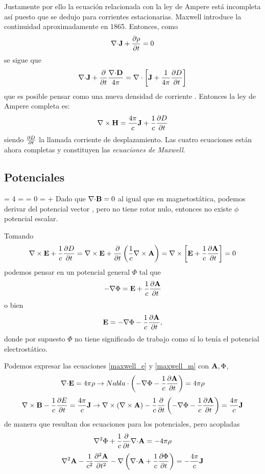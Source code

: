 \documentclass[10pt,oneside]{CBFT_book}
\begin{document}
Justamente por ello la ecuación relacionada con la ley de Ampere está incompleta así puesto que se dedujo
para corrientes estacionarias. Maxwell introduce la continuidad aproximadamente en 1865.
Entonces, como 
\[
	\mathbf{\nabla}\mathbf{\cdot}\mathbf{J} + \frac{\partial^{\hspace{-0.05em}} {\rho}}{\partial {t }^{\hspace{-0.05em}}} = 0 
\]
se sigue que 
\[
	\divem{J} + \frac{\partial}{\partial t} \frac{\divem{D}}{4\pi} =
	\Nabla\cdot\left[ \vb{J} + \frac{1}{4\pi} \dpar{D}{t} \right]
\]
que es posible pensar como una nueva densidad de corriente . 
Entonces la ley de Ampere completa es:
\[
	\rotorm{H} = \frac{4\pi}{c} \vb{J} + \frac{1}{c}\dpar{D}{t}
\]
siendo $\frac{\partial^{\hspace{-0.05em}} {D}}{\partial {t}^{\hspace{-0.05em}}}$ la llamada corriente de desplazamiento. 
Las cuatro ecuaciones están ahora completas y constituyen las {\it ecuaciones de Maxwell}.

\subsection{Potenciales}

\be
	 = 4 \pi \rho \qquad \qquad {} =  
	\label{maxwell_e}
\ee
\be
	 = 0 \qquad \qquad {} =   + 
	\label{maxwell_m}
\ee
Dado que $\mathbf{\nabla}\mathbf{\cdot}\mathbf{B} = 0$ al igual que en magnetostática, podemos derivar  del potencial 
vector , pero  no tiene rotor nulo, entonces no existe $\phi$ potencial escalar.

Tomando
\[
	\rotorm{E} + \frac{1}{c}\dpar{D}{t} = \rotorm{E} + \frac{\partial}{\partial t}\left( \frac{1}{c} 
	\rotorm{A}\right) = \Nabla\times\left[ \vb{E} + \frac{1}{c}\dpar{\vb{A}}{t}\right] = 0
\]
podemos pensar en un potencial general $\Phi$ tal que 
\[
	- \Nabla \Phi = \vb{E} + \frac{1}{c}\dpar{\vb{A}}{t}
\]
o bien 
\[
	\vb{E}  = -\Nabla \Phi - \frac{1}{c}\dpar{\vb{A}}{t},
\]
donde por supuesto $\Phi$ no tiene significado de trabajo como sí lo tenía el potencial
electrostático.

Podemos expresar las ecuaciones \eqref{maxwell_e} y \eqref{maxwell_m} con $\vb{A},\Phi$,
\[
	\divem{E} = 4\pi\rho \rightarrow 
	Nabla\cdot\left( -\Nabla \Phi - \frac{1}{c}\dpar{\vb{A}}{t} \right) = 4\pi\rho
\]
\[
	\rotorm{B} - \frac{1}{c}\dpar{E}{t} =  \frac{4\pi}{c} \vb{J}  \rightarrow
	\Nabla\times(\rotorm{A}) - \frac{1}{c}\frac{\partial}{\partial t}\left( 
	-\Nabla \Phi - \frac{1}{c}\dpar{\vb{A}}{t} \right)=  \frac{4\pi}{c}\vb{J}
\]
de manera que resultan dos ecuaciones para los potenciales, pero acopladas
\[
	\nabla^2 \Phi + \frac{1}{c} \frac{\partial}{\partial t}\mathbf{\nabla}\mathbf{\cdot}\mathbf{A} = -4 \pi \rho
\]
\[
	\nabla^2 \vb{A} - \frac{1}{c^2} \dpar[2]{\vb{A}}{t} -\Nabla \left( \divem{A} + \frac{1}{c}
	\dpar{\Phi}{t} \right) = -\frac{4\pi}{c} \vb{J}
\]
\end{document}
